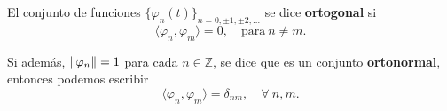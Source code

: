 







\begin{defi}
El conjunto de funciones $\{\varphi_n(t)\}_{n=0, \pm 1, \pm 2, \dots}$ se dice \textbf{ortogonal} si 
$$\langle \varphi_n , \varphi_m \rangle = 0, \quad \mbox{para} ~ n \neq m.$$

Si además, $\lVert\varphi_n\rVert = 1$ para cada $n \in \mathbb{Z}$, se dice que es un conjunto \textbf{ortonormal}, entonces podemos escribir 
$$\langle \varphi_n , \varphi_m \rangle = \delta_{nm}, \quad \forall \ n,m.$$
\end{defi}

